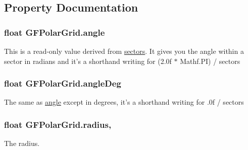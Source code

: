 \subsection{Property Documentation}
\hypertarget{class_g_f_polar_grid_ad57e2dcf03806e576191953034dcd74c_ad57e2dcf03806e576191953034dcd74c}{
\subsubsection[{angle}]{\setlength{\rightskip}{0pt plus 5cm}float G\+F\+Polar\+Grid.\+angle\hspace{0.3cm}{\ttfamily [get]}}}\label{class_g_f_polar_grid_ad57e2dcf03806e576191953034dcd74c_ad57e2dcf03806e576191953034dcd74c}
This is a read-\/only value derived from {\ttfamily \hyperlink{class_g_f_polar_grid_a10ed1b65007dca14afb8fb6d22d36de0_a10ed1b65007dca14afb8fb6d22d36de0}{sectors}}. It gives you the angle within a sector in radians and it’s a shorthand writing for {\ttfamily (2.\+0f $\ast$ Mathf.\+P\+I) / sectors} \hypertarget{class_g_f_polar_grid_a5c0e2072d09f3add6e4012b89ce8d21e_a5c0e2072d09f3add6e4012b89ce8d21e}{
\subsubsection[{angle\+Deg}]{\setlength{\rightskip}{0pt plus 5cm}float G\+F\+Polar\+Grid.\+angle\+Deg\hspace{0.3cm}{\ttfamily [get]}}}\label{class_g_f_polar_grid_a5c0e2072d09f3add6e4012b89ce8d21e_a5c0e2072d09f3add6e4012b89ce8d21e}
The same as {\ttfamily \hyperlink{class_g_f_polar_grid_ad57e2dcf03806e576191953034dcd74c_ad57e2dcf03806e576191953034dcd74c}{angle}} except in degrees, it’s a shorthand writing for {.\+0f / sectors} \hypertarget{class_g_f_polar_grid_a71bf429c8c2630684969db7f7483416a_a71bf429c8c2630684969db7f7483416a}{
\subsubsection[{radius}]{\setlength{\rightskip}{0pt plus 5cm}float G\+F\+Polar\+Grid.\+radius\hspace{0.3cm}{\ttfamily [get]}, {\ttfamily [set]}}}\label{class_g_f_polar_grid_a71bf429c8c2630684969db7f7483416a_a71bf429c8c2630684969db7f7483416a}
The radius.


